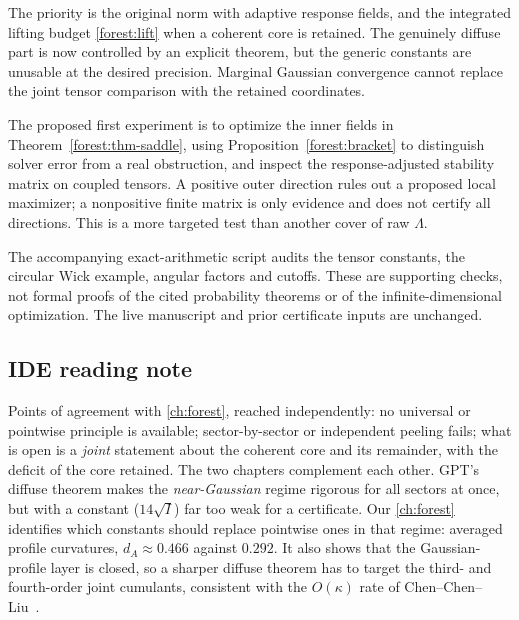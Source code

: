 The priority is the original norm with adaptive response fields,
and the integrated lifting budget \eqref{forest:lift} when a coherent
core is retained. The genuinely diffuse part is now controlled by an
explicit theorem, but the generic constants are unusable at the
desired precision. Marginal Gaussian convergence cannot replace the
joint tensor comparison with the retained coordinates.

The proposed first experiment is to optimize the inner fields in
Theorem~\ref{forest:thm-saddle}, using Proposition~\ref{forest:bracket}
to distinguish solver error from a real obstruction, and inspect the
response-adjusted stability matrix on coupled tensors. A positive
outer direction rules out a proposed local maximizer; a nonpositive
finite matrix is only evidence and does not certify all directions.
This is a more targeted test than another cover of raw \(\Lambda\).

The accompanying exact-arithmetic script audits the tensor constants,
the circular Wick example, angular factors and cutoffs. These are
supporting checks, not formal proofs of the cited probability
theorems or of the infinite-dimensional optimization.
The live manuscript and prior certificate inputs are unchanged.

\subsection{IDE reading note}\label{sec:gpt-forest-reading}
Points of agreement with \autoref{ch:forest}, reached independently: no universal or pointwise principle is available; sector-by-sector or independent peeling fails; what is open is a
\emph{joint} statement about the coherent core and its remainder, with the deficit of the core retained. The two chapters complement each other. GPT's diffuse theorem makes the
\emph{near-Gaussian} regime rigorous for all sectors at once, but with a constant ($14\sqrt I$) far too weak for a certificate. Our \autoref{ch:forest} identifies which constants
should replace pointwise ones in that regime: averaged profile curvatures, $d_A\approx0.466$ against $0.292$. It also shows that the Gaussian-profile layer is closed, so a sharper diffuse
theorem has to target the third- and fourth-order joint cumulants, consistent with the $O(\kappa)$ rate of Chen--Chen--Liu~\cite{ccl}.
